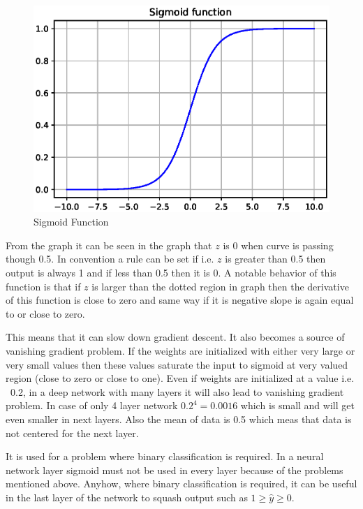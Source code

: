 \documentclass[11pt]{article}
\begin{document}
\begin{figure}[H]
	\includegraphics[width=\linewidth]{files/cnn_architecture/sigmoid.eps}
	\caption{Sigmoid Function}
	\label{fig: Sigmoid}
\end{figure}

From the graph it can be seen in the graph that $z$ is 0 when curve is passing though 0.5. In convention a rule can be set if i.e. $z$ is greater than 0.5 then output is always 1 and if less than 0.5 then it is 0. A notable behavior of this function is that if $z$ is larger than the dotted region in graph then the derivative of this function is close to zero and same way if it is negative slope is again equal to or close to zero. 

This means that it can slow down gradient descent. It also becomes a source of vanishing gradient problem. If the weights are initialized with either very large or very small values then these values saturate the input to sigmoid at very valued region (close to zero or close to one). Even if weights are initialized at a value i.e. ~0.2, in a deep network with many layers it will also lead to vanishing gradient problem. In case of only 4 layer network $0.2^{4}=0.0016$ which is small and will get even smaller in next layers. Also the mean of data is 0.5 which meas that data is not centered for the next layer. 

It is used for a problem where binary classification is required. In a neural network layer sigmoid must not be used in every layer because of the problems mentioned above. Anyhow, where binary classification is required, it can be useful in the last layer of the network to squash output such as $ 1 \geq \hat{y} \geq 0$.
\end{document}
